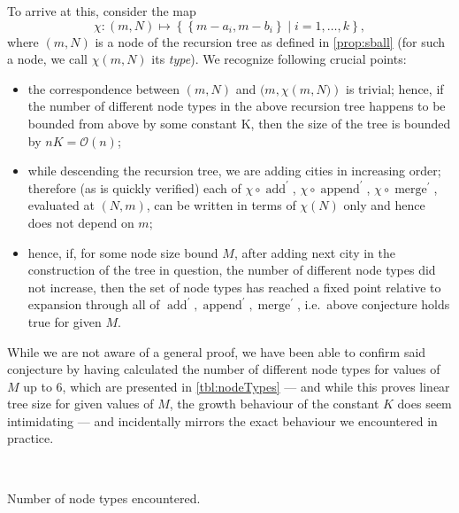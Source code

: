 \documentclass[index=totoc,bibliography=totoc]{scrartcl}
\numberwithin{equation}{section}
\numberwithin{figure}{section}
\numberwithin{table}{section}
\let\defstyle\itshape
\begin{document}
To arrive at this, consider the map
\[
  \chi : \left(m,N\right) \mapsto \left\{\left\{m-a_i,m-b_i\right\} \mid i = 1,\ldots,k \right\},
\]
where $\left(m,N\right)$ is a node of the recursion tree as defined in \cref{prop:sball}
(for such a node, we call $\chi\left(m,N\right)$ its {\defstyle type}).
We recognize following crucial points:
\begin{itemize}
  \item
    the correspondence between $\left(m,N\right)$ and $(m,\chi\left(m,N)\right)$ is trivial;
    hence, if the number of different node types in the above recursion tree happens
    to be bounded from above by some constant K, then the size of the tree is
    bounded by $nK = \mathcal{O}\left(n\right)$;
  \item
    while descending the recursion tree, we are adding cities in increasing order;
    therefore (as is quickly verified) each of
    $\chi \circ \operatorname{add}^\prime$,
    $\chi \circ \operatorname{append}^\prime$,
    $\chi \circ \operatorname{merge}^\prime$,
    evaluated at $\left(N,m\right)$, can be written in terms of $\chi\left(N\right)$ only
    and hence does not depend on $m$;
  \item
    hence, if, for some node size bound $M$, after adding next city in the
    construction of the tree in question, the number of different node
    types did not increase, then the set of node types has
    reached a fixed point relative to expansion through all of
    $\operatorname{add}^\prime, \operatorname{append}^\prime, \operatorname{merge}^\prime$,
    i.e.\ above conjecture holds true for given $M$.
\end{itemize}

While we are not aware of a general proof, we have been able to confirm
said conjecture by having calculated the number of different node types for
values of $M$ up to $6$, which are presented in \cref{tbl:nodeTypes} ---
and while this proves linear tree size for given values of $M$, the growth
behaviour of the constant $K$ does seem intimidating --- and incidentally
mirrors the exact behaviour we encountered in practice.

\begin{table}[htb]
\centering
    \mbox{%
    }
\caption{Number of node types encountered.}%
\label{tbl:nodeTypes}%
\end{table}
\end{document}
